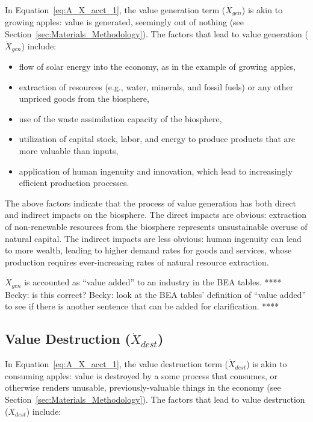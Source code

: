 \noindent In Equation~\ref{eq:A_X_acct_1}, 
the value generation term ($\dot{X}_{gen}$) is akin to growing apples: 
value is generated, seemingly out of nothing
(see Section~\ref{sec:Materials_Methodology}).
The factors that lead to value generation 
($\dot{X}_{gen}$) include:

\begin{itemize}
	\item{flow of solar energy 
	into the economy,
	as in the example of growing apples,}
	\item{extraction of resources (e.g., water, minerals, and
	fossil fuels) or any other unpriced goods from the biosphere,}
	\item{use of the waste assimilation capacity of the biosphere,}
	\item{utilization of capital stock, labor, and energy to produce products
	that are more valuable than inputs,}
	\item{application of human ingenuity 
	and innovation, 
	which lead to increasingly efficient production processes.}
\end{itemize}

The above factors indicate that the process of value generation
has both direct and indirect impacts on the biosphere.
The direct impacts are obvious: 
extraction of non-renewable resources from the biosphere 
represents unsustainable overuse of natural capital.
The indirect impacts are less obvious: 
human ingenuity can lead to more wealth,
leading to higher demand rates for goods and services, 
whose production requires ever-increasing rates of natural resource extraction.

$\dot{X}_{gen}$ is accounted as ``value added'' to an industry in the BEA tables.
**** Becky: is this correct? 
Becky: look at the BEA tables' definition of ``value added'' to 
see if there is another sentence that can be added for clarification. ****


\subsection{Value Destruction ($\dot{X}_{dest}$)}

\noindent In Equation~\ref{eq:A_X_acct_1}, 
the value destruction term ($\dot{X}_{dest}$) is akin to consuming apples: 
value is destroyed by a some process that consumes, or otherwise
renders unusable, previously-valuable things in the economy
(see Section~\ref{sec:Materials_Methodology}).
The factors that lead to value destruction 
($\dot{X}_{dest}$) include:

